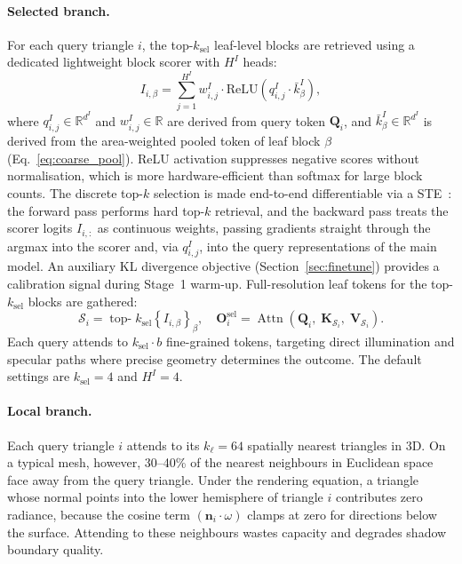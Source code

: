 \documentclass{egpubl}
\begin{document}
\paragraph{Selected branch.}
For each query triangle $i$, the top-$k_\text{sel}$ leaf-level blocks are
retrieved using a dedicated lightweight block scorer with $H^I$ heads:
\begin{equation}
  I_{i,\beta} = \sum_{j=1}^{H^I} w^I_{i,j}
                \cdot \mathrm{ReLU}\!\left(q^I_{i,j} \cdot \bar{k}^I_\beta\right),
  \label{eq:scorer}
\end{equation}
where $q^I_{i,j} \in \mathbb{R}^{d^I}$ and $w^I_{i,j} \in \mathbb{R}$ are
derived from query token $\mathbf{Q}_i$, and $\bar{k}^I_\beta \in \mathbb{R}^{d^I}$
is derived from the area-weighted pooled token of leaf block $\beta$
(Eq.~\ref{eq:coarse_pool}).
ReLU activation suppresses negative scores without normalisation, which is
more hardware-efficient than softmax for large block counts.
The discrete top-$k$ selection is made end-to-end differentiable via a
STE~\cite{bengio2013estimating}: the forward pass performs hard top-$k$
retrieval, and the backward pass treats the scorer logits $I_{i,:}$ as
continuous weights, passing gradients straight through the argmax into
the scorer and, via $q^I_{i,j}$, into the query representations of the
main model.
An auxiliary KL divergence objective (Section~\ref{sec:finetune}) provides
a calibration signal during Stage~1 warm-up.
Full-resolution leaf tokens for the top-$k_\text{sel}$ blocks are gathered:
\begin{equation}
  \mathcal{S}_i = \operatorname{top-}k_\text{sel}\!\left\{ I_{i,\beta} \right\}_\beta,
  \quad
  \mathbf{O}_i^\text{sel} =
    \operatorname{Attn}\!\left(
      \mathbf{Q}_i,\; \mathbf{K}_{\mathcal{S}_i},\; \mathbf{V}_{\mathcal{S}_i}
    \right).
  \label{eq:sel}
\end{equation}
Each query attends to $k_\text{sel} \cdot b$ fine-grained tokens, targeting
direct illumination and specular paths where precise geometry determines the
outcome.
The default settings are $k_\text{sel} = 4$ and $H^I = 4$.

\paragraph{Local branch.}
Each query triangle $i$ attends to its $k_\ell = 64$ spatially nearest
triangles in 3D.
On a typical mesh, however, 30--40\% of the nearest neighbours in
Euclidean space face away from the query triangle.
Under the rendering equation, a triangle whose normal points into the
lower hemisphere of triangle $i$ contributes zero radiance, because the
cosine term $(\mathbf{n}_i \cdot \omega)$ clamps at zero for directions
below the surface.
Attending to these neighbours wastes capacity and degrades shadow
boundary quality.
\end{document}
